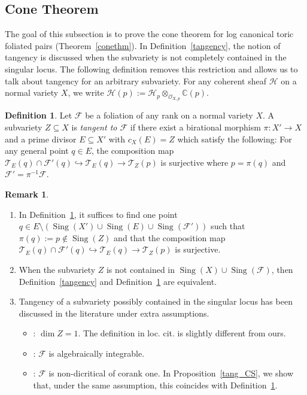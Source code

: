 \documentclass[12pt,reqno]{amsart}
\theoremstyle{definition}
\newtheorem{definition}[theorem]{Definition}
\newtheorem{remark}[theorem]{Remark}
\newcommand{\mc}{\mathcal}
\newcommand{\mb}{\mathbb}
\newcommand{\on}{\operatorname}
\newcommand\cF{{\mathcal{F}}}
\newcommand\cT{{\mathcal{T}}}
\begin{document}
\subsection{Cone Theorem}
The goal of this subsection is to prove the cone theorem for log canonical toric foliated pairs (Theorem~\ref{conethm}). 
In Definition~\ref{tangency}, the notion of tangency is discussed when the subvariety is not completely contained in the singular locus.  
The following definition removes this restriction and allows us to talk about tangency for an arbitrary subvariety. For any coherent sheaf $\mc H$ on a normal variety $X$, we write $\mc H(p):=\mc H_p\otimes_{\mc O_{X,p}}\mb C(p)$. 

\begin{definition}\label{defn_tang_general}
    Let $\cF$ be a foliation of any rank on a normal variety $X$. 
    A subvariety $Z\subseteq X$ is \emph{tangent to $\cF$} if there exist a birational morphism $\pi\colon X'\to X$ and a prime divisor $E\subseteq X'$ with $c_X(E)=Z$ which satisfy the following: 
    For any general point $q\in E$, the composition map $\cT_E(q)\cap\cF'(q)\hookrightarrow\cT_E(q) \to \cT_Z(p)$ is surjective where $p=\pi(q)$ and $\cF'=\pi^{-1}\cF$.
\end{definition}

\begin{remark}\label{rmk_tang_general}\hspace{1em}
    \begin{enumerate}
        \item In Definition~\ref{defn_tang_general}, it suffices to find one point  $q\in E\setminus\left(\on{Sing}(X')\cup\on{Sing}(E)\cup\on{Sing}(\cF')\right)$ such that $\pi(q):=p\notin\on{Sing}(Z)$ and that the composition map $\cT_E(q)\cap\cF'(q)\hookrightarrow\cT_E(q) \to \cT_Z(p)$ is surjective.

        \item When the subvariety $Z$ is not contained in $\on{Sing}(X)\cup\on{Sing}(\cF)$, then Definition~\ref{tangency} and Definition~\ref{defn_tang_general} are equivalent. 

        \item 
        Tangency of a subvariety possibly contained in the singular locus has been discussed in the literature under extra assumptions.
        \begin{itemize}
            \item \cite[Definition 3.2]{wang2023toric}: $\dim Z=1$.
            The definition in loc. cit. is slightly different from ours.  
            \item \cite[Subsection 3.4]{ambro2021positivity}: $\mc F$ is algebraically integrable.
            \item \cite[Definition 2.12]{CS}: $\mc F$ is non-dicritical of corank one.
            In Proposition~\ref{tang_CS}, we show that, under the same assumption, this coincides with Definition~\ref{defn_tang_general}. 
        \end{itemize}
    \end{enumerate} 
\end{remark}
\end{document}
